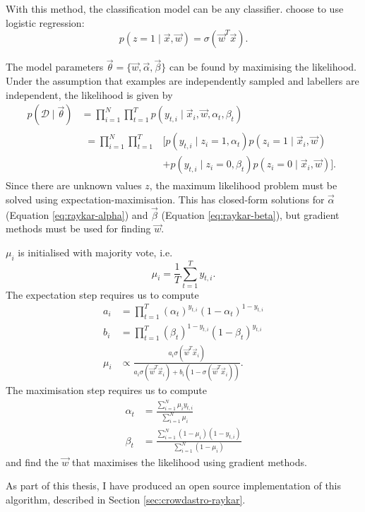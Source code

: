             With this method, the classification model can be any classifier. \citeauthor{raykar10} choose to use logistic regression:
            \begin{equation*}
                p(z = 1 \mid \vec x, \vec w) = \sigma(\vec w^T \vec x).
            \end{equation*}

            The model parameters $\vec \theta = \{\vec w, \vec \alpha, \vec \beta\}$ can be found by maximising the likelihood. Under the assumption that examples are independently sampled and labellers are independent, the likelihood is given by
            \begin{align*}
                p(\mathcal D \mid \vec \theta) &= \prod_{i = 1}^N \prod_{t = 1}^T p(y_{t, i} \mid \vec x_i, \vec w, \alpha_t, \beta_t)\\
                &\begin{aligned}= \prod_{i = 1}^N \prod_{t = 1}^T &\bigg[p(y_{t, i} \mid z_i = 1, \alpha_t) p(z_i = 1 \mid \vec x_i, \vec w)\\
                                                                  &+ p(y_{t, i} \mid z_i = 0, \beta_t) p(z_i = 0 \mid \vec x_i, \vec w)\bigg].\end{aligned}
            \end{align*}
            Since there are unknown values $z$, the maximum likelihood problem must be solved using expectation-maximisation. This has closed-form solutions for $\vec \alpha$ (Equation \ref{eq:raykar-alpha}) and $\vec \beta$ (Equation \ref{eq:raykar-beta}), but gradient methods must be used for finding $\vec w$.

            $\mu_i$ is initialised with majority vote, i.e.
            \begin{equation*}
                \mu_i = \frac{1}{T} \sum_{t = 1}^T y_{t, i}.
            \end{equation*}
            The expectation step requires us to compute
            \begin{align*}
                a_i &= \prod_{t = 1}^T (\alpha_t)^{y_{t, i}} (1 - \alpha_t)^{1 - y_{t, i}}\\
                b_i &= \prod_{t = 1}^T (\beta_t)^{1 - y_{t, i}} (1 - \beta_t)^{y_{t, i}}\\
                \mu_i &\propto \frac{a_i \sigma(\vec w^T \vec x_i)}{a_i \sigma(\vec w^T \vec x_i) + b_i (1 - \sigma(\vec w^T \vec x_i))}.
            \end{align*}
            The maximisation step requires us to compute
            \begin{align}
                \label{eq:raykar-alpha}
                \alpha_t &= \frac{\sum_{i = 1}^N \mu_i y_{t, i}}{\sum_{i = 1}^N \mu_i}\\
                \label{eq:raykar-beta}
                \beta_t &= \frac{\sum_{i = 1}^N (1 - \mu_i) (1 - y_{t, i})}{\sum_{i = 1}^N (1 - \mu_i)}
            \end{align}
            and find the $\vec w$ that maximises the likelihood using gradient methods.

            As part of this thesis, I have produced an open source implementation of this algorithm, described in Section \ref{sec:crowdastro-raykar}.

